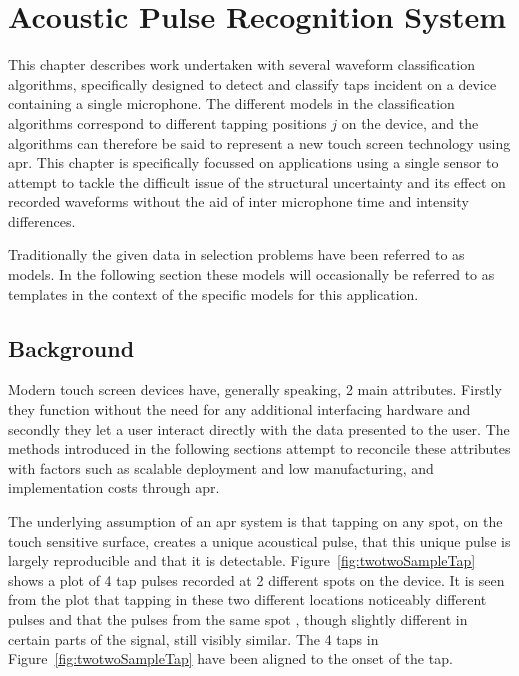 \chapter{Acoustic Pulse Recognition System}\label{ch:APR}

\ifpdf
    \graphicspath{{Chapter3_APR/Chapter3Figs/PNG/}{Chapter3_APR/Chapter3Figs/PDF/}{Chapter3_APR/Chapter3Figs/}{Chapter3_APR/Chapter3Figs/PDF/}{Chapter3_APR/Chapter3Figs/Kamplitude/}}
\else
    \graphicspath{{Chapter3_APR/Chapter3Figs/EPS/}{Chapter3_APR/Chapter3Figs/}}
\fi

This chapter describes work undertaken with several waveform classification algorithms, specifically designed to detect and classify taps incident on a device containing a single microphone. The different models in the classification algorithms correspond to different tapping positions $j$ on the device, and the algorithms can therefore be said to represent a new touch screen technology using \DIFdelbegin {}\DIFdelend \DIFaddbegin \gls{apr}\DIFaddend . This chapter is specifically focussed on applications using a single sensor to attempt to tackle the difficult issue of the structural uncertainty and its effect on recorded waveforms without the aid of inter microphone time and intensity differences.

Traditionally the given data in selection problems have been referred to as models. In the following section these models will occasionally be referred to as templates in the context of the specific models for this application.

\section{Background}
Modern touch screen devices have, generally speaking, 2 main attributes. Firstly they function without the need for any additional interfacing hardware and secondly they let a user interact directly with the data presented to the user. The methods introduced in the following sections attempt to reconcile these attributes with factors such as scalable deployment and low manufacturing, and implementation costs through \DIFdelbegin {}\DIFdelend \DIFaddbegin \gls{apr}\DIFaddend .

The underlying assumption of an \DIFdelbegin {}\DIFdelend \DIFaddbegin \gls{apr} \DIFaddend system is that tapping on any spot, on the touch sensitive surface, creates a unique acoustical pulse, that this unique pulse is largely reproducible and that it is detectable. Figure~\ref{fig:twotwoSampleTap} shows a plot of 4 tap pulses recorded at 2 different spots on the device. It is seen from the plot that tapping in these two different locations \DIFdelbegin {}\DIFdelend \DIFaddbegin {}\DIFaddend noticeably different pulses and that the pulses from the same spot \DIFdelbegin {}\DIFdelend \DIFaddbegin {}\DIFaddend , though slightly different in certain parts of the signal, still visibly similar. The 4 taps in Figure~\ref{fig:twotwoSampleTap} have been aligned to the onset of the tap.

